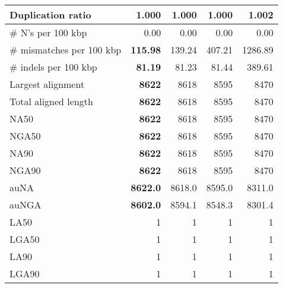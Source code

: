 \documentclass[12pt,a4paper]{article}
\begin{document}
\begin{table}[ht]
\begin{center}
\begin{tabular}{|l*{4}{|r}|}
Duplication ratio & {\bf 1.000} & {\bf 1.000} & {\bf 1.000} & 1.002 \\ \hline
\# N's per 100 kbp & 0.00 & 0.00 & 0.00 & 0.00 \\ \hline
\# mismatches per 100 kbp & {\bf 115.98} & 139.24 & 407.21 & 1286.89 \\ \hline
\# indels per 100 kbp & {\bf 81.19} & 81.23 & 81.44 & 389.61 \\ \hline
Largest alignment & {\bf 8622} & 8618 & 8595 & 8470 \\ \hline
Total aligned length & {\bf 8622} & 8618 & 8595 & 8470 \\ \hline
NA50 & {\bf 8622} & 8618 & 8595 & 8470 \\ \hline
NGA50 & {\bf 8622} & 8618 & 8595 & 8470 \\ \hline
NA90 & {\bf 8622} & 8618 & 8595 & 8470 \\ \hline
NGA90 & {\bf 8622} & 8618 & 8595 & 8470 \\ \hline
auNA & {\bf 8622.0} & 8618.0 & 8595.0 & 8311.0 \\ \hline
auNGA & {\bf 8602.0} & 8594.1 & 8548.3 & 8301.4 \\ \hline
LA50 & 1 & 1 & 1 & 1 \\ \hline
LGA50 & 1 & 1 & 1 & 1 \\ \hline
LA90 & 1 & 1 & 1 & 1 \\ \hline
LGA90 & 1 & 1 & 1 & 1 \\ \hline
\end{tabular}
\end{center}
\end{table}
\end{document}
